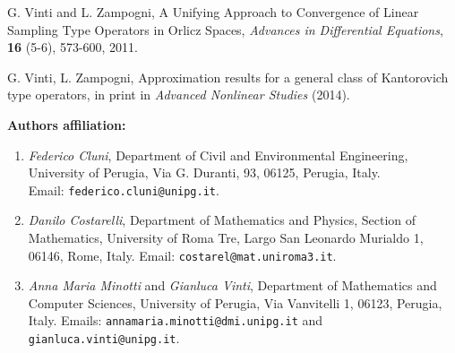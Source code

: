 \documentclass[11pt,a4paper]{article}
\begin{document}
\begin{thebibliography}{99}
{  G. Vinti and L. Zampogni, A Unifying Approach to Convergence of Linear Sampling Type Operators  in Orlicz Spaces, {\em Advances in Differential Equations},   {\bf 16} (5-6), 573-600, 2011.

 G. Vinti, L. Zampogni, Approximation results for a general class of  Kantorovich type operators, in print in {\em Advanced Nonlinear Studies} (2014). 


}

\end{thebibliography}

\vskip0.1cm
{\footnotesize
{\bf Authors affiliation:}
\vskip0.1cm
\begin{enumerate}
\item {\em Federico Cluni},  Department of Civil and Environmental Engineering, University of Perugia, Via G. Duranti, 93, 06125, Perugia, Italy.\\
Email: {\tt federico.cluni@unipg.it}.

\item {\em Danilo Costarelli}, Department of Mathematics and Physics, Section of Mathematics, University of Roma Tre, Largo San Leonardo Murialdo 1, 06146, Rome, Italy. Email: {\tt costarel@mat.uniroma3.it}.

\item {\em Anna Maria Minotti} and {\em Gianluca Vinti}, Department of Mathematics and Computer Sciences, University of Perugia, Via Vanvitelli 1, 06123, Perugia, Italy. Emails: {\tt annamaria.minotti@dmi.unipg.it} and {\tt gianluca.vinti@unipg.it}.
\end{enumerate}
}
\end{document}
